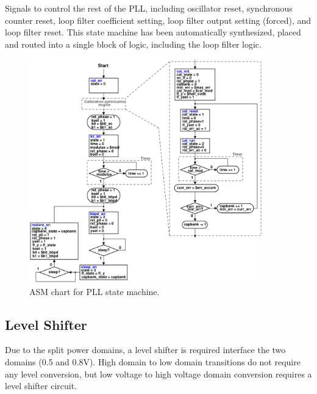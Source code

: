 	Signals to control the rest of the PLL, including oscillator reset, synchronous counter reset, loop filter coefficient setting, loop filter output setting (forced), and loop filter reset. This state machine has been automatically synthesized, placed and routed into a single block of logic, including the loop filter logic.


			\begin{figure}[htb!]
			        \centering
			        \includegraphics[width=0.9\textwidth, angle=0]{./figs/pll_asm}
			    \caption{ASM chart for PLL state machine.}
			    \label{fig:asm}
			\end{figure}



	\FloatBarrier
	\subsection{Level Shifter}
	Due to the split power domains, a level shifter is required interface the two domains (0.5 and 0.8V). High domain to low domain transitions do not require any level conversion, but low voltage to high voltage domain conversion requires a level shifter circuit. 

